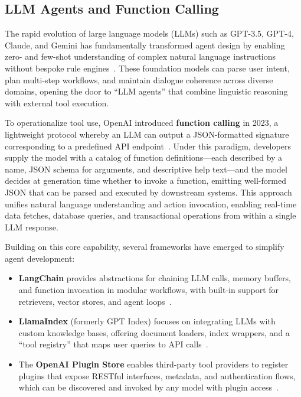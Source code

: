 \documentclass{article}
\begin{document}
\subsection{LLM Agents and Function Calling}
The rapid evolution of large language models (LLMs) such as GPT-3.5, GPT-4, Claude, and Gemini has fundamentally transformed agent design by enabling zero- and few-shot understanding of complex natural language instructions without bespoke rule engines~\cite{bommasani2021opportunities}.  These foundation models can parse user intent, plan multi-step workflows, and maintain dialogue coherence across diverse domains, opening the door to “LLM agents” that combine linguistic reasoning with external tool execution.

To operationalize tool use, OpenAI introduced \textbf{function calling} in 2023, a lightweight protocol whereby an LLM can output a JSON-formatted signature corresponding to a predefined API endpoint~\cite{openai2023function}.  Under this paradigm, developers supply the model with a catalog of function definitions—each described by a name, JSON schema for arguments, and descriptive help text—and the model decides at generation time whether to invoke a function, emitting well-formed JSON that can be parsed and executed by downstream systems.  This approach unifies natural language understanding and action invocation, enabling real-time data fetches, database queries, and transactional operations from within a single LLM response.

Building on this core capability, several frameworks have emerged to simplify agent development:
\begin{itemize}
  \item \textbf{LangChain} provides abstractions for chaining LLM calls, memory buffers, and function invocation in modular workflows, with built-in support for retrievers, vector stores, and agent loops~\cite{chase2022langchain}.
  \item \textbf{LlamaIndex} (formerly GPT Index) focuses on integrating LLMs with custom knowledge bases, offering document loaders, index wrappers, and a “tool registry” that maps user queries to API calls~\cite{wu2023llamaindex}.
  \item The \textbf{OpenAI Plugin Store} enables third-party tool providers to register plugins that expose RESTful interfaces, metadata, and authentication flows, which can be discovered and invoked by any model with plugin access~\cite{openai2023plugin}.
\end{itemize}
\end{document}
